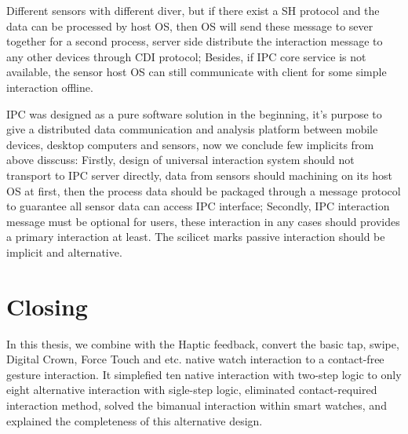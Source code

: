 Different sensors with different diver, but if there exist a SH protocol and the data can be processed by host OS, then OS will send these message to sever together for a second process, server side distribute the interaction message to any other devices through CDI protocol; Besides, if IPC core service is not available, the sensor host OS can still communicate with client for some simple interaction offline.


IPC was designed as a pure software solution in the beginning, it's purpose to give a distributed data communication and analysis platform between mobile devices, desktop computers and sensors, now we conclude few implicits from above disscuss:
Firstly, design of universal interaction system should not transport to IPC server directly, data from sensors should machining on its host OS at first, then the process data should be packaged through a message protocol to guarantee all sensor data can access IPC interface;
Secondly, IPC interaction message must be optional for users, these interaction in any cases should provides a primary interaction at least. The scilicet marks passive interaction should be implicit and alternative.

\section{Closing}

In this thesis, we combine with the Haptic feedback, convert the basic tap, swipe, Digital Crown, Force Touch and etc. native watch interaction to a contact-free gesture interaction. It simplefied ten native interaction with two-step logic to only eight alternative interaction with sigle-step logic, eliminated contact-required interaction method, solved the bimanual interaction within smart watches, and explained the completeness of this alternative design.

